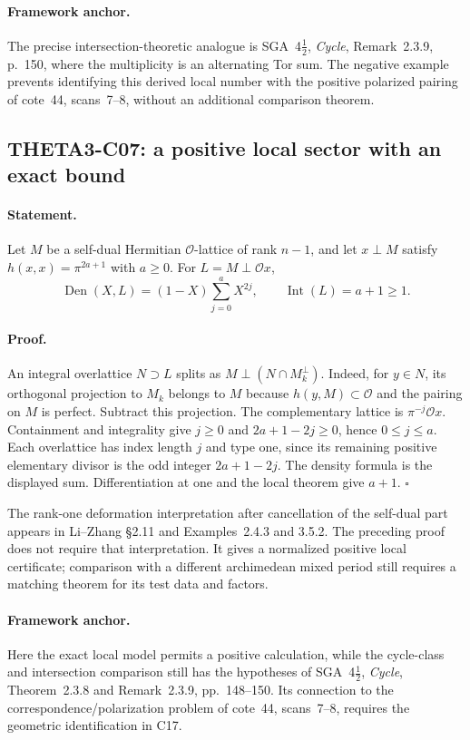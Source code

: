 \paragraph{Framework anchor.}
The precise intersection-theoretic analogue is SGA~4$\frac12$,
\emph{Cycle}, Remark~2.3.9, p.~150, where the multiplicity is an
alternating Tor sum.  The negative example prevents identifying this
derived local number with the positive polarized pairing of cote~44,
scans~7--8, without an additional comparison theorem.

\subsection{THETA3-C07: a positive local sector with an exact bound}\label{C07}

\paragraph{Statement.}
Let $M$ be a self-dual Hermitian $\mathcal O$-lattice of rank $n-1$,
and let $x\perp M$ satisfy $h(x,x)=\pi^{2a+1}$ with $a\geq0$.
For $L=M\perp\mathcal O x$,
\[
 \operatorname{Den}(X,L)=(1-X)\sum_{j=0}^aX^{2j},
 \qquad \operatorname{Int}(L)=a+1\geq1.
\]

\paragraph{Proof.}
An integral overlattice $N\supset L$ splits as
$M\perp(N\cap M_k^\perp)$. Indeed, for $y\in N$, its orthogonal
projection to $M_k$ belongs to $M$ because $h(y,M)\subset\mathcal O$
and the pairing on $M$ is perfect. Subtract this projection.
The complementary lattice is $\pi^{-j}\mathcal O x$. Containment
and integrality give $j\geq0$ and $2a+1-2j\geq0$, hence
$0\leq j\leq a$. Each overlattice has index length $j$ and type
one, since its remaining positive elementary divisor is the odd
integer $2a+1-2j$. The density formula is the displayed sum.
Differentiation at one and the local theorem give $a+1$.
$\square$

The rank-one deformation interpretation after cancellation of the
self-dual part appears in Li--Zhang \S2.11 and Examples~2.4.3 and
3.5.2. The preceding proof does not require that interpretation.
It gives a normalized positive local certificate; comparison with
a different archimedean mixed period still requires a matching
theorem for its test data and factors.

\paragraph{Framework anchor.}
Here the exact local model permits a positive calculation, while the
cycle-class and intersection comparison still has the hypotheses of
SGA~4$\frac12$, \emph{Cycle}, Theorem~2.3.8 and Remark~2.3.9,
pp.~148--150.  Its connection to the correspondence/polarization problem
of cote~44, scans~7--8, requires the geometric identification in C17.

